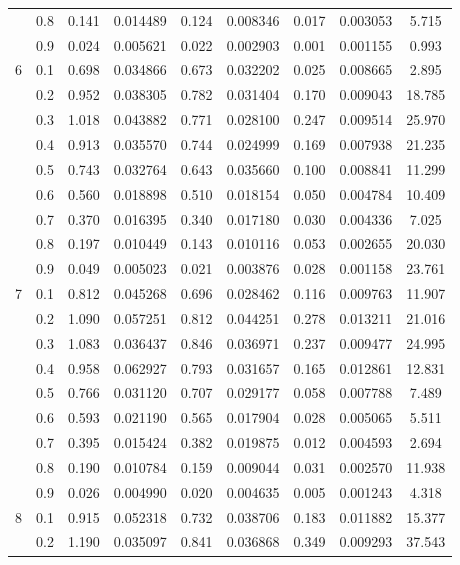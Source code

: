 \begin{longtable}{ | c | c || c | c | c | c | c | c | c | }
 & 0.8 & 0.141 & 0.014489 & 0.124 & 0.008346 & 0.017 & 0.003053 & 5.715 \\
 & 0.9 & 0.024 & 0.005621 & 0.022 & 0.002903 & 0.001 & 0.001155 & 0.993 \\
 \hline
\multirow{9}{*}{6} & 0.1 & 0.698 & 0.034866 & 0.673 & 0.032202 & 0.025 & 0.008665 & 2.895 \\
 & 0.2 & 0.952 & 0.038305 & 0.782 & 0.031404 & 0.170 & 0.009043 & 18.785 \\
 & 0.3 & 1.018 & 0.043882 & 0.771 & 0.028100 & 0.247 & 0.009514 & 25.970 \\
 & 0.4 & 0.913 & 0.035570 & 0.744 & 0.024999 & 0.169 & 0.007938 & 21.235 \\
 & 0.5 & 0.743 & 0.032764 & 0.643 & 0.035660 & 0.100 & 0.008841 & 11.299 \\
 & 0.6 & 0.560 & 0.018898 & 0.510 & 0.018154 & 0.050 & 0.004784 & 10.409 \\
 & 0.7 & 0.370 & 0.016395 & 0.340 & 0.017180 & 0.030 & 0.004336 & 7.025 \\
 & 0.8 & 0.197 & 0.010449 & 0.143 & 0.010116 & 0.053 & 0.002655 & 20.030 \\
 & 0.9 & 0.049 & 0.005023 & 0.021 & 0.003876 & 0.028 & 0.001158 & 23.761 \\
 \hline
\multirow{9}{*}{7} & 0.1 & 0.812 & 0.045268 & 0.696 & 0.028462 & 0.116 & 0.009763 & 11.907 \\
 & 0.2 & 1.090 & 0.057251 & 0.812 & 0.044251 & 0.278 & 0.013211 & 21.016 \\
 & 0.3 & 1.083 & 0.036437 & 0.846 & 0.036971 & 0.237 & 0.009477 & 24.995 \\
 & 0.4 & 0.958 & 0.062927 & 0.793 & 0.031657 & 0.165 & 0.012861 & 12.831 \\
 & 0.5 & 0.766 & 0.031120 & 0.707 & 0.029177 & 0.058 & 0.007788 & 7.489 \\
 & 0.6 & 0.593 & 0.021190 & 0.565 & 0.017904 & 0.028 & 0.005065 & 5.511 \\
 & 0.7 & 0.395 & 0.015424 & 0.382 & 0.019875 & 0.012 & 0.004593 & 2.694 \\
 & 0.8 & 0.190 & 0.010784 & 0.159 & 0.009044 & 0.031 & 0.002570 & 11.938 \\
 & 0.9 & 0.026 & 0.004990 & 0.020 & 0.004635 & 0.005 & 0.001243 & 4.318 \\
 \hline
\multirow{9}{*}{8} & 0.1 & 0.915 & 0.052318 & 0.732 & 0.038706 & 0.183 & 0.011882 & 15.377 \\
 & 0.2 & 1.190 & 0.035097 & 0.841 & 0.036868 & 0.349 & 0.009293 & 37.543 \\

\end{longtable}
